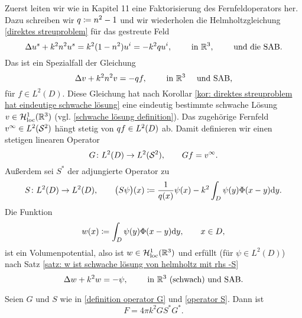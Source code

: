 Zuerst leiten wir wie in Kapitel 11 eine Faktorisierung des Fernfeldoperators her. Dazu schreiben wir \(q\coloneqq n^2-1\) und wir wiederholen die Helmholtzgleichung \eqref{direktes streuproblem} für das gestreute Feld
\begin{equation}
	\label{wiederholung helmholtzgleichung für gestreutes feld}
	\Delta u^s+k^2n^2u^s=k^2(1-n^2)u^i=-k^2q u^i,\qquad\text{ in }\mathbb{R}^3,\qquad\text{ und die SAB.}
\end{equation}
Das ist ein Spezialfall der Gleichung
\begin{equation}
	\label{allgemeine hg für rhs -qf}
	\Delta v+k^2n^2v=-q f,\qquad\text{ in }\mathbb{R}^3\quad\text{ und SAB,}
\end{equation}
für \(f\in L^2(D)\). Diese Gleichung hat nach Korollar \ref{kor: direktes streuproblem hat eindeutige schwache lösung} eine eindeutig bestimmte schwache Lösung \(v\in\mathcal{H}_{\mathrm{loc}}^1(\mathbb{R}^3)\) (vgl. \eqref{schwache lösung definition}). Das zugehörige Fernfeld \(v^\infty\in L^2(\mathcal{S}^2)\) hängt stetig von \(q f\in L^2(D)\) ab. Damit definieren wir einen stetigen linearen Operator
\begin{equation}
	\label{definition operator G}
	G\colon L^2(D) \to L^2(\mathcal{S}^2),\qquad Gf=v^\infty.
\end{equation}
Außerdem sei \(S^\ast\) der adjungierte Operator zu
\begin{equation}
	\label{operator S}
	S\colon L^2(D) \to L^2(D),\qquad\big(S\psi\big)(x)\coloneqq\frac{1}{q(x)}\psi(x)-k^2\int_D\psi(y)\Phi(x-y)\mathrm{d}y.
\end{equation}
Die Funktion
\begin{equation*}
	w(x)\coloneqq\int_D\psi(y)\Phi(x-y)\mathrm{d}y,\qquad x\in D,
\end{equation*}
ist ein Volumenpotential, also ist \(w\in\mathcal{H}_{\mathrm{loc}}^1(\mathbb{R}^3)\) und erfüllt (für \(\psi\in L^2(D)\)) nach Satz \ref{satz: w ist schwache lösung von helmholtz mit rhs -S}
\begin{equation}
	\label{starke formulierung hg mit rhs -psi und SAB}
	\Delta w+k^2w=-\psi,\qquad\text{ in }\mathbb{R}^3\text{ (schwach) und SAB.}
\end{equation}
\begin{satz}\label{satz: faktorisierung von F}
	Seien \(G\) und \(S\) wie in \eqref{definition operator G} und \eqref{operator S}. Dann ist
	\begin{equation}
		\label{faktorisierung von F}
		F=4\pi k^2GS^\ast G^\ast.
	\end{equation}
\end{satz}
